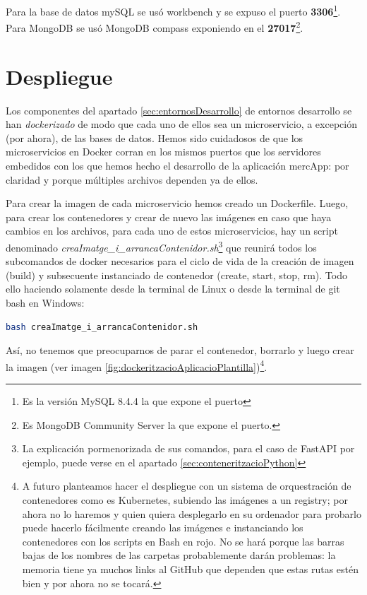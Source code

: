 \documentclass[a4paper,12pt]{report}
\begin{document}
				Para la base de datos mySQL se usó workbench y se expuso el puerto \textbf{3306}\footnote{Es la versión MySQL 8.4.4 la que expone el puerto}. Para MongoDB se usó MongoDB compass exponiendo en el \textbf{27017}\footnote{Es MongoDB Community Server la que expone el puerto.}.
		
	
			\section{Despliegue}
			\label{sec:despliegue}
				Los componentes del apartado \ref{sec:entornosDesarrollo} de entornos  desarrollo se han \textit{dockerizado} de modo que cada uno de ellos sea un microservicio, a excepción (por ahora), de las bases de datos. Hemos sido cuidadosos de que los microservicios en Docker corran en los mismos puertos que los servidores embedidos con los que hemos hecho el desarrollo de la aplicación mercApp: por claridad y porque múltiples archivos dependen ya de ellos.
				
				Para crear la imagen de cada microservicio hemos creado un Dockerfile. Luego, para crear los contenedores y crear de nuevo las imágenes en caso que haya cambios en los archivos, para cada uno de estos microservicios, hay un script denominado \textit{creaImatge\_i\_arrancaContenidor.sh}\footnote{La explicación pormenorizada de sus comandos, para el caso de FastAPI por ejemplo, puede verse en el apartado \ref{sec:conteneritzacioPython}} que reunirá todos los subcomandos de docker necesarios para el ciclo de vida de la creación de imagen (build) y subsecuente instanciado de contenedor (create, start, stop, rm). Todo ello haciendo solamente desde la terminal de Linux o desde la terminal de git bash en Windows: 
				
				\begin{lstlisting}[language=bash]
	bash creaImatge_i_arrancaContenidor.sh
				\end{lstlisting}
				
				
				
				
				
				Así, no tenemos que preocuparnos de parar el contenedor, borrarlo y luego crear la imagen (ver imagen \ref{fig:dockeritzacioAplicacioPlantilla})\footnote{ A futuro planteamos hacer el despliegue con un sistema de orquestración de contenedores como es Kubernetes, subiendo las imágenes a un registry; por ahora no lo haremos y quien quiera desplegarlo en su ordenador para probarlo puede hacerlo fácilmente creando las imágenes e instanciando los contenedores con los scripts en Bash en rojo. No se hará porque las barras bajas de los nombres de las carpetas probablemente darán problemas: la memoria tiene ya muchos links al GitHub que dependen que estas rutas estén bien y por ahora no se tocará.}.
				
\end{document}
